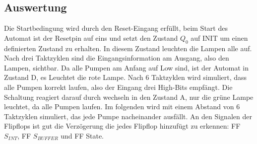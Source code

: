\subsection{Auswertung}
Die Startbedingung wird durch den Reset-Eingang erfüllt, beim Start des Automat ist der Resetpin auf eins und setzt den Zustand $Q_0$ auf \glqq INIT\grqq{} um einen definierten Zustand zu erhalten. In diesem Zustand leuchten die Lampen alle auf. Nach drei Taktzyklen sind die Eingangsinformation am Ausgang, also den Lampen, sichtbar. Da alle Pumpen am Anfang auf Low sind, ist der Automat in Zustand D, es Leuchtet die rote Lampe. Nach 6 Taktzyklen wird simuliert, dass alle Pumpen korrekt laufen, also der Eingang drei High-Bits empfängt. Die Schaltung reagiert darauf durch wechseln in den Zustand A, nur die grüne Lampe leuchtet, da alle Pumpen laufen. Im folgenden wird mit einem Abstand von 6 Taktzyklen simuliert, das jede Pumpe nacheinander ausfällt. An den Signalen der Flipflops ist gut die Verzögerung die jedes Flipflop hinzufügt zu erkennen: FF $S_{INT}$, FF $S_{BUFFER}$ und FF State.

